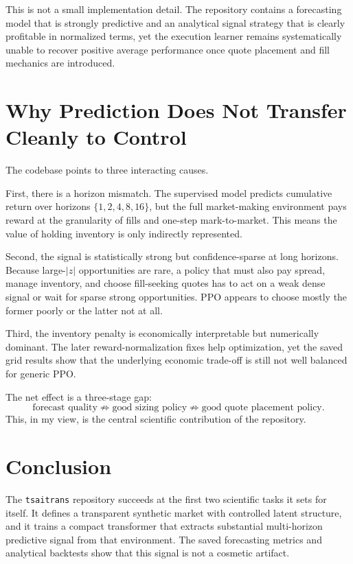 \documentclass[11pt]{article}
\begin{document}
This is not a small implementation detail. The repository contains a forecasting model that is strongly predictive and an analytical signal strategy that is clearly profitable in normalized terms, yet the execution learner remains systematically unable to recover positive average performance once quote placement and fill mechanics are introduced.

\section{Why Prediction Does Not Transfer Cleanly to Control}
The codebase points to three interacting causes.

First, there is a horizon mismatch. The supervised model predicts cumulative return over horizons \(\{1,2,4,8,16\}\), but the full market-making environment pays reward at the granularity of fills and one-step mark-to-market. This means the value of holding inventory is only indirectly represented.

Second, the signal is statistically strong but confidence-sparse at long horizons. Because large-\(|z|\) opportunities are rare, a policy that must also pay spread, manage inventory, and choose fill-seeking quotes has to act on a weak dense signal or wait for sparse strong opportunities. PPO appears to choose mostly the former poorly or the latter not at all.

Third, the inventory penalty is economically interpretable but numerically dominant. The later reward-normalization fixes help optimization, yet the saved grid results show that the underlying economic trade-off is still not well balanced for generic PPO.

The net effect is a three-stage gap:
\[
\text{forecast quality} \not\Rightarrow \text{good sizing policy} \not\Rightarrow \text{good quote placement policy}.
\]
This, in my view, is the central scientific contribution of the repository.

\section{Conclusion}
The \texttt{tsaitrans} repository succeeds at the first two scientific tasks it sets for itself. It defines a transparent synthetic market with controlled latent structure, and it trains a compact transformer that extracts substantial multi-horizon predictive signal from that environment. The saved forecasting metrics and analytical backtests show that this signal is not a cosmetic artifact.
\end{document}
